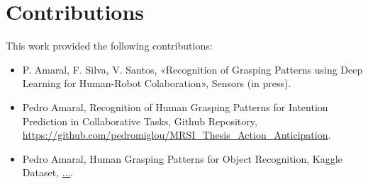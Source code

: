 \section{Contributions}

This work provided the following contributions:

\begin{itemize}
    \item P. Amaral, F. Silva, V. Santos, «Recognition of Grasping Patterns using Deep Learning for Human-Robot Colaboration», Sensors (in press).
    \item Pedro Amaral, Recognition of Human Grasping Patterns for Intention Prediction in Collaborative Tasks, Github Repository, \url{https://github.com/pedromiglou/MRSI_Thesis_Action_Anticipation}.
    \item Pedro Amaral, Human Grasping Patterns for Object Recognition, Kaggle Dataset, \textcolor{red}{\url{...}}.
\end{itemize}

